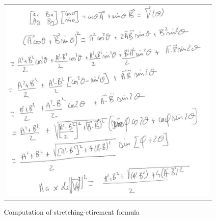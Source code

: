 \begin{figure}
\begin{tabular}{|c|}
   \hline \hline
   \includegraphics[width=160mm]{FIGS/Formules/CalcEtir.JPG}
\end{tabular}
\label{Not:CalcEtir}
\caption{Computation of stretching-etirement formula}
\end{figure}


